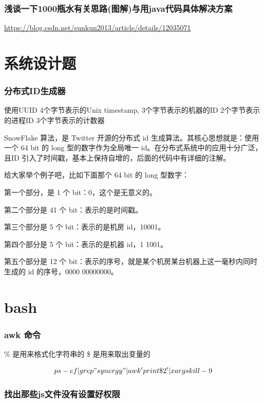 \documentclass[UTF8]{ctexart}
\begin{document}
\subsubsection{浅谈一下1000瓶水有关思路(图解)与用java代码具体解决方案}
\url{https://blog.csdn.net/sunkun2013/article/details/12035071}


\section{系统设计题}
\subsubsection{分布式ID生成器}

使用UUID
4个字节表示的Unix timestamp,
3个字节表示的机器的ID
2个字节表示的进程ID
3个字节表示的计数器

SnowFlake 算法，是 Twitter 开源的分布式 id 生成算法。其核心思想就是：使用一个 64 bit 的 long 型的数字作为全局唯一 id。在分布式系统中的应用十分广泛，且ID 引入了时间戳，基本上保持自增的，后面的代码中有详细的注解。

给大家举个例子吧，比如下面那个 64 bit 的 long 型数字：

第一个部分，是 1 个 bit：0，这个是无意义的。

第二个部分是 41 个 bit：表示的是时间戳。

第三个部分是 5 个 bit：表示的是机房 id，10001。

第四个部分是 5 个 bit：表示的是机器 id，1 1001。

第五个部分是 12 个 bit：表示的序号，就是某个机房某台机器上这一毫秒内同时生成的 id 的序号，0000 00000000。

\section{bash}



\subsubsection{awk 命令}
\% 是用来格式化字符串的
\$ 是用来取出变量的

$$
	ps -ef | grep "synergy" | awk 'print \$2' | xargs kill -9
$$

\subsubsection{找出那些js文件没有设置好权限}
\end{document}
